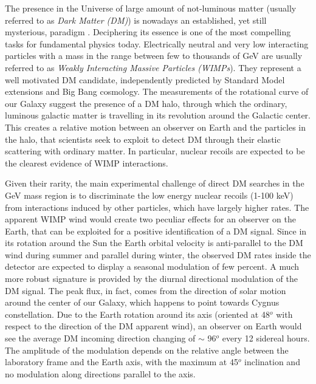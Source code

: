 \documentclass[physics,article,submit,moreauthors,pdftex]{Definitions/mdpi}
\begin{document}
The presence in the Universe of large amount of not-luminous matter (usually referred to as {\it Dark Matter (DM)}) is nowadays an established, yet still mysterious, paradigm \cite{Bertone:2004pz}. Deciphering its essence is one of the most compelling tasks for fundamental physics today. Electrically neutral and very low interacting particles with a mass in the range between few to thousands of GeV are usually referred to as {\it Weakly Interacting Massive Particles (WIMPs}). They represent a well motivated DM candidate, independently predicted by Standard Model extensions and Big Bang cosmology. The measurements of the rotational curve of our Galaxy suggest the presence of a DM halo, through which the ordinary, luminous galactic matter is travelling in its revolution around the Galactic center. This creates a relative motion between an observer on Earth and the particles in the halo, that scientists seek to exploit to detect DM through their elastic scattering with ordinary matter. In particular, nuclear recoils are expected to be the clearest evidence of WIMP interactions.

Given their rarity, the main experimental challenge of direct DM searches in the GeV mass region is to discriminate the low energy nuclear recoils (1-100 keV) from interactions induced by other particles, which have largely higher rates. The apparent WIMP wind would create two peculiar effects for an observer on the Earth, that can be exploited for a positive identification of a DM signal. Since in its rotation around the Sun the Earth orbital velocity is anti-parallel to the DM wind during summer and parallel during winter, the observed DM rates inside the detector are expected to display a seasonal modulation of few percent. A much more robust signature is provided by the diurnal directional modulation of the DM signal. The peak flux, in fact, comes from the direction of solar motion around the center of our Galaxy, which happens to point towards Cygnus constellation. Due to the Earth rotation around its axis (oriented at 48$^{o}$ with respect to the direction of the DM apparent wind), an observer on Earth would see the average DM incoming direction changing of $\sim$ 96$^{o}$ every 12 sidereal hours. The amplitude of the modulation depends on the relative angle between the laboratory frame and the Earth axis, with the maximum at 45$^{o}$ inclination and no modulation along directions parallel to the axis.
\end{document}
